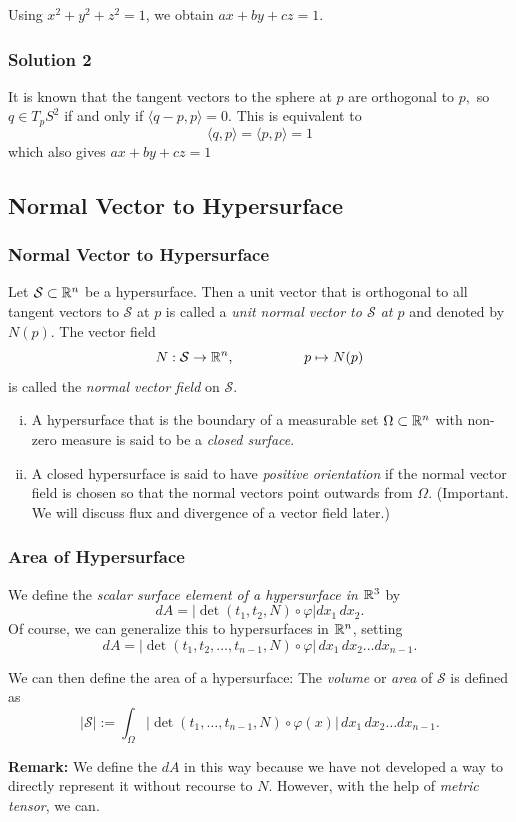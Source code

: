 \documentclass[12pt, t]{beamer}
\renewcommand{\emph}[1]{{\color{Turquoise3}\textsl{#1}}}
\newcommand{\Remark}{\textbf{Remark: }}
\begin{document}
\begin{frame}[allowframebreaks]
    Using $x^2 + y^2 + z^2 = 1$, we obtain $ax + by + cz = 1$.
\end{frame}

\begin{frame}
    \frametitle{Solution 2}
    It is known that the tangent vectors to the sphere at $p$ are orthogonal to $p,$ so $q \in T_{p} S^{2}$ if and only if $\langle q-p, p\rangle=0 .$ This is equivalent to
    \[
        \langle q, p\rangle=\langle p, p\rangle=1
    \]
    which also gives $a x+b y+c z=1$


\end{frame}

\subsection{Normal Vector to Hypersurface}
\begin{frame}
    \frametitle{Normal Vector to Hypersurface}
    Let $\mathcal{S}\subset\mathbb{R}^n$ be a hypersurface. Then a unit vector that is orthogonal to all tangent vectors to $\mathcal{S}$ at $p$ is called a \emph{unit normal vector to $\mathcal{S}$ at $p$} and denoted by $N(p)$. The vector field
    \[N:\mathcal{S}\to\mathbb{R}^n,\qquad\qquad\quad
        p\mapsto N(p)\]
    is called the \emph{normal vector field} on $\mathcal{S}$.

    \begin{enumerate}[(i)]
        \item A hypersurface that is the boundary of a measurable set $\Omega\subset\mathbb{R}^n$ with non-zero measure is said to be a \emph{closed surface}.
        \item A closed hypersurface is said to have \emph{positive orientation} if the
              normal vector field is chosen so that the normal vectors point
              outwards from $\Omega$. (Important. We will discuss flux and divergence of a vector field later.)
    \end{enumerate}
\end{frame}

\begin{frame}
    \frametitle{Area of Hypersurface}

    We define the \emph{scalar surface element of a hypersurface in $\mathbb{R}^3$} by
    \[dA=|\det(t_1,t_2,N)\circ\varphi|dx_1\,dx_2.\]
    Of course, we can generalize this to hypersurfaces in $\mathbb{R}^n$, setting
    \[dA=|\det(t_1,t_2,\ldots,t_{n-1},N)\circ
        \varphi|\,dx_1\,dx_2\ldots dx_{n-1}.\]

    We can then define the area of a hypersurface:
    The \emph{volume} or \emph{area} of $\mathcal{S}$ is defined as
    \[|\mathcal{S}|:=\int_\Omega|\det(t_1,\ldots,t_{n-1},N)
        \circ\varphi(x)|\,dx_1\,dx_2\ldots dx_{n-1}.\]

    \Remark We define the $dA$ in this way because we have not developed a way to directly represent it without recourse to $N$. However, with the help of \emph{metric tensor}, we can.
\end{frame}
\end{document}
